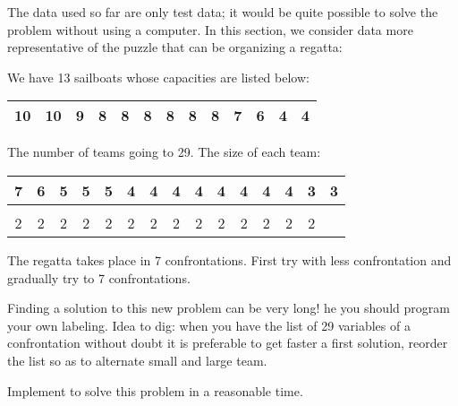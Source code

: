 The data used so far are only test data; it would be quite possible to solve the problem without using a computer.
In this section, we consider data more representative of the puzzle that can be organizing a regatta:

We have 13 sailboats whose capacities are listed below:
\begin{center}
    \begin{tabular}{|c|c|c|c|c|c|c|c|c|c|c|c|c|}
        \hline
        10&10&9&8&8&8&8&8&8&7&6&4&4\\
        \hline
    \end{tabular}
\end{center}
  
The number of teams going to 29. The size of each team:
\begin{center}
    \begin{tabular}{|c|c|c|c|c|c|c|c|c|c|c|c|c|c|c|}
        \hline
        7 & 6 & 5 & 5 & 5 & 4 & 4 & 4 & 4 & 4 & 4 & 4 & 4 & 3 & 3\\
        \hline
        \multicolumn{15}{c}{}\\
        \cline{1-14}
        2 & 2 & 2 & 2 & 2 & 2 & 2 & 2 & 2 & 2 & 2 & 2 & 2 & 2 & \multicolumn{1}{c}{}\\
        \cline{1-14}
    \end{tabular}
\end{center}

The regatta takes place in 7 confrontations. First try with
less confrontation and gradually try to 7
confrontations.


Finding a solution to this new problem can be very long! he
you should program your own labeling. Idea to dig:
when you have the list of 29 variables of a confrontation without
doubt it is preferable to get faster a first solution,
reorder the list so as to alternate small and large team.

\begin{question}
 Implement  to solve this problem in a reasonable time.
 \end{question}

